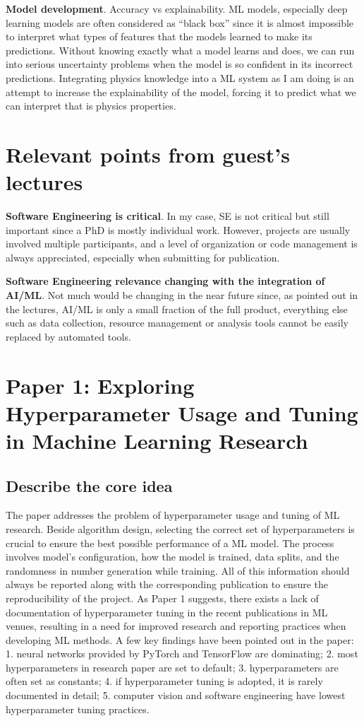 \documentclass{article}
\begin{document}
\textbf{Model development}. Accuracy vs explainability. ML models, especially deep learning models are often considered as “black box” since it is almost impossible to interpret what types of features that the models learned to make its predictions. Without knowing exactly what a model learns and does, we can run into serious uncertainty problems when the model is so confident in its incorrect predictions. Integrating physics knowledge into a ML system as I am doing is an attempt to increase the explainability of the model, forcing it to predict what we can interpret that is physics properties.

\section{Relevant points from guest’s lectures}

\textbf{Software Engineering is critical}. In my case, SE is not critical but still important since a PhD is mostly individual work. However, projects are usually involved multiple participants, and a level of organization or code management is always appreciated, especially when submitting for publication.

\textbf{Software Engineering relevance changing with the integration of AI/ML}. Not much would be changing in the near future since, as pointed out in the lectures, AI/ML is only a small fraction of the full product, everything else such as data collection, resource management or analysis tools cannot be easily replaced by automated tools.

\newpage
\section{Paper 1: Exploring Hyperparameter Usage and Tuning in Machine Learning Research}
\subsection{Describe the core idea}
The paper addresses the problem of hyperparameter usage and tuning of ML research. Beside algorithm design, selecting the correct set of hyperparameters is crucial to ensure the best possible performance of a ML model. The process involves model's configuration, how the model is trained, data splits, and the randomness in number generation while training. All of this information should always be reported along with the corresponding publication to ensure the reproducibility of the project. As Paper 1 suggests, there exists a lack of documentation of hyperparameter tuning in the recent publications in ML venues, resulting in a need for improved research and reporting practices when developing ML methods. A few key findings have been pointed out in the paper: 1. neural networks provided by PyTorch and TensorFlow are dominating; 2. most hyperparameters in research paper are set to default; 3. hyperparameters are often set as constants; 4. if hyperparameter tuning is adopted, it is rarely documented in detail; 5. computer vision and software engineering have lowest hyperparameter tuning practices. 
\end{document}
